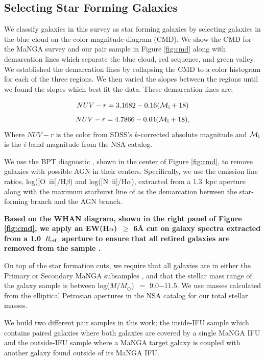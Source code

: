 \documentclass[iop,revtex4,twocolumn,apj,numberedappendix,appendixfloats]{emulateapj}
\newcommand{\reff}{$R_{\rm eff}$}
\newcommand{\ewha}{EW(H$\alpha$)}
\newcommand{\logm}{log($M/M_{\odot}$)}
\begin{document}
\subsection{Selecting Star Forming Galaxies}\label{sec:sf}

We classify galaxies in this survey as star forming galaxies by selecting galaxies in the blue cloud on the color-magnitude diagram (CMD). We show the CMD for the MaNGA survey and our pair sample in Figure \ref{fig:cmd} along with demarcation lines which separate the blue cloud, red sequence, and green valley. We established the demarcation lines by collapsing the CMD to a color histogram for each of the three regions. We then varied the slopes between the regions until we found the slopes which best fit the data. These demarcation lines are;

\begin{equation}\label{eq:blue}
NUV-r = 3.1682 - 0.16 (\mathcal{M}_{\rm i}+18)
\end{equation}
\begin{equation}\label{eq:red}
NUV-r = 4.7866 - 0.04 (\mathcal{M}_{\rm i}+18),
\end{equation}
Where $NUV-r$ is the color from SDSS's $k$-corrected absolute magnitude and $\mathcal{M}_{\rm i}$ is the $i$-band magnitude from the NSA catalog. 

We use the BPT diagnostic \citep{Baldwin:1981}, shown in the center of Figure \ref{fig:cmd}, to remove galaxies with possible AGN in their centers. Specifically, we use the emission line ratios, log([O~{\sc iii}]/H$\beta$) and log([N~{\sc ii}]/H$\alpha$), extracted from a 1.3~kpc aperture along with the maximum starburst line of \citet{Kewley:2001} as the demarcation between the star-forming branch and the AGN branch.

\textbf{Based on the WHAN diagram, shown in the right panel of Figure \ref{fig:cmd}, we apply an \ewha\ $\ge$ \textbf{6\AA} cut on galaxy spectra extracted from a 1.0~\reff\ aperture to ensure that all \textbf{retired} galaxies are removed from the sample \citep{Cid-Fernandes:2011}.} 

On top of the star formation cuts, we require that all galaxies are in either the Primary or Secondary MaNGA subsamples \citep{Wake:2017}, and that the stellar mass range of the galaxy sample is between \logm\ $=$ 9.0$-$11.5. We use masses calculated from the elliptical Petrosian apertures in the NSA catalog for our total stellar masses. 

We build two different pair samples in this work; the inside-IFU sample which contains paired galaxies where both galaxies are covered by a single MaNGA IFU and the outside-IFU sample where a MaNGA target galaxy is coupled with another galaxy found outside of its MaNGA IFU. 
\end{document}
